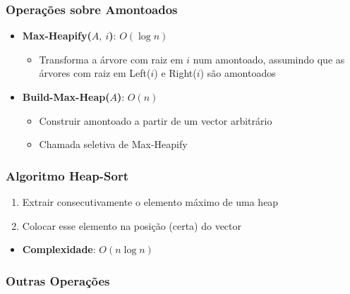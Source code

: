 \documentclass[11pt]{article}
\begin{document}
\subsubsection{Operações sobre Amontoados}

\begin{itemize}[topsep=0pt]
    \item \textbf{Max-Heapify($A,\ i$)}: $O(\log n)$
          \begin{itemize}[topsep=0pt]
              \item Transforma a árvore com raiz em $i$ num amontoado, assumindo que as árvores com raiz em Left($i$) e Right($i$) são amontoados
          \end{itemize}
    \item \textbf{Build-Max-Heap($A$)}: $O(n)$
          \begin{itemize}[topsep=0pt]
              \item Construir amontoado a partir de um vector arbitrário
              \item Chamada seletiva de Max-Heapify
          \end{itemize}
\end{itemize}

\subsubsection{Algoritmo Heap-Sort}

\begin{enumerate}
    \item Extrair consecutivamente o elemento máximo de uma heap
    \item Colocar esse elemento na posição (certa) do vector
\end{enumerate}
\begin{itemize}[topsep=0pt]
    \item \textbf{Complexidade}: $O(n \log n)$
\end{itemize}

\subsubsection{Outras Operações}
\end{document}
